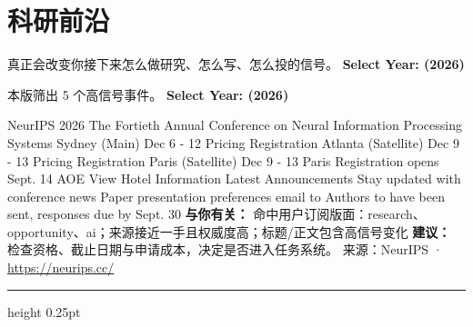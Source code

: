 \documentclass[10.5pt]{ctexart}
\begin{document}
\section*{科研前沿}
{\color{ormuted} 真正会改变你接下来怎么做研究、怎么写、怎么投的信号。}
\vspace{2mm}
{\LARGE\bfseries Select Year: (2026)}\par
\vspace{1mm}
{\color{ormuted} 本版筛出 5 个高信号事件。}
\vspace{3mm}
{\Large\bfseries Select Year: (2026)}\par
NeurIPS 2026 The Fortieth Annual Conference on Neural Information Processing Systems Sydney (Main) Dec 6 - 12 Pricing Registration Atlanta (Satellite) Dec 9 - 13 Pricing Registration Paris (Satellite) Dec 9 - 13 Paris Registration opens Sept. 14 AOE View Hotel Information Latest Announcements Stay updated with conference news Paper presentation preferences email to Authors to have been sent, responses due by Sept. 30
\textbf{与你有关：} 命中用户订阅版面：research、opportunity、ai；来源接近一手且权威度高；标题/正文包含高信号变化
\textbf{建议：} 检查资格、截止日期与申请成本，决定是否进入任务系统。
{\footnotesize\color{ormuted} 来源：NeurIPS · \url{https://neurips.cc/}}
\vspace{4mm}
\hrule height 0.25pt
\vspace{3mm}
\end{document}
